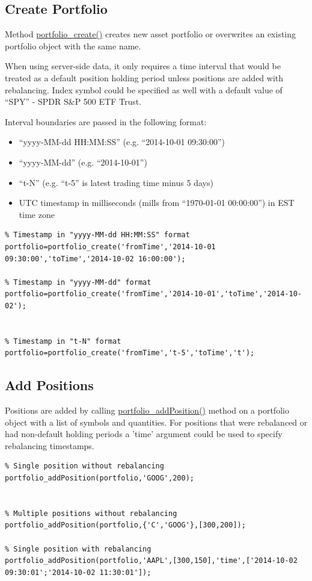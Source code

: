\documentclass[letterpaper]{report}
\newcounter{N}
\begin{document}
\subsection {Create Portfolio}
Method
\href{https://www.portfolioeffect.com/docs/platform/quant/functions/general-functions/portfolio-create}{portfolio\_create()}
creates new asset portfolio or overwrites an existing portfolio object with the
same name. \par
When using server-side data, it only requires a time interval that would be
treated as a default position holding period unless positions are added with rebalancing.
Index symbol could be specified as well with a default value of ``SPY'' - SPDR
S\&P 500 ETF Trust.
\par
Interval boundaries are passed in the following format:
\begin{itemize} 
  \item ``yyyy-MM-dd HH:MM:SS'' (e.g. ``2014-10-01 09:30:00'')
  \item ``yyyy-MM-dd'' (e.g. ``2014-10-01'')
  \item ``t-N'' (e.g. ``t-5'' is latest trading time minus 5 days)
  \item UTC timestamp in milliseconds (mills from ``1970-01-01 00:00:00'') in EST
  time zone
\end{itemize}
\begin{lstlisting}
% Timestamp in "yyyy-MM-dd HH:MM:SS" format
portfolio=portfolio_create('fromTime','2014-10-01 09:30:00','toTime','2014-10-02 16:00:00');

% Timestamp in "yyyy-MM-dd" format
portfolio=portfolio_create('fromTime','2014-10-01','toTime','2014-10-02');


% Timestamp in "t-N" format
portfolio=portfolio_create('fromTime','t-5','toTime','t');
\end{lstlisting}

\subsection {Add Positions}
Positions are added by calling
\href{https://www.portfolioeffect.com/docs/platform/quant/functions/general-functions/portfolio-add-position}{portfolio\_addPosition()}
method on a portfolio object with a list of symbols and quantities. For
positions that were rebalanced or had non-default holding periods a 'time' argument could be used to specify rebalancing timestamps.
\begin{lstlisting}
% Single position without rebalancing
portfolio_addPosition(portfolio,'GOOG',200);


% Multiple positions without rebalancing
portfolio_addPosition(portfolio,{'C','GOOG'},[300,200]);

% Single position with rebalancing
portfolio_addPosition(portfolio,'AAPL',[300,150],'time',['2014-10-02 09:30:01';'2014-10-02 11:30:01']);
\end{lstlisting}
\end{document}
